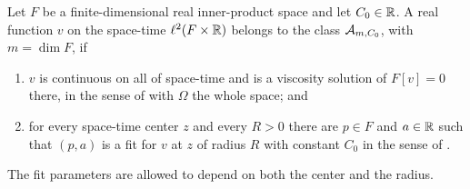 \begin{definition}
Let $F$ be a finite-dimensional real inner-product space and let $C_0\in\mathbb{R}$. A
real function $v$ on the space-time $\ell^2(F\times\mathbb{R})$ belongs to the class
$\mathcal{A}_{m,C_0}$, with $m=\dim F$, if
\begin{enumerate}
\item $v$ is continuous on all of space-time and is a viscosity solution of
$F[v]=0$ there, in the sense of  with
$\Omega$ the whole space; and
\item for every space-time center $z$ and every $R>0$ there are $p\in F$ and
$a\in\mathbb{R}$ such that $(p,a)$ is a fit for $v$ at $z$ of radius $R$ with constant
$C_0$ in the sense of .
\end{enumerate}
The fit parameters are allowed to depend on both the center and the radius.
\end{definition}
